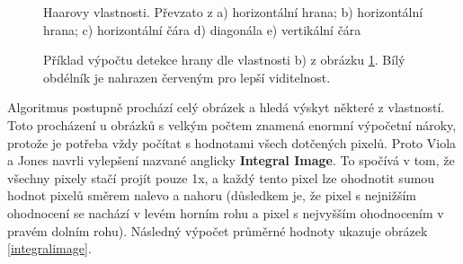 \begin{figure}[H]
  \begin{center}
  \label{haarfeatures}
  \caption{Haarovy vlastnosti. Převzato z \cite{violaJonesArticle}
  a) horizontální hrana; b) horizontální hrana; c) horizontální čára d) diagonála e) vertikální čára}
  \end{center}
\end{figure}

\begin{figure}[H]
  \begin{center}
  \label{haarexample}
  \caption{Příklad výpočtu detekce hrany dle vlastnosti b) z obrázku \ref{haarfeatures}. Bílý obdélník je nahrazen červeným pro lepší viditelnost.}
  \end{center}
\end{figure}

Algoritmus postupně prochází celý obrázek a hledá výskyt některé z vlastností. Toto procházení u obrázků s velkým počtem znamená enormní výpočetní nároky, protože je potřeba vždy počítat s hodnotami všech dotčených pixelů. Proto Viola a Jones \cite{violaJones} navrli
vylepšení nazvané anglicky \textbf{Integral Image}. To spočívá v tom, že všechny pixely stačí projít pouze 1x, a každý tento pixel lze ohodnotit sumou hodnot pixelů směrem nalevo a nahoru (důsledkem je, že pixel s nejnižším ohodnocení se nachází v levém horním rohu a pixel s nejvyšším ohodnocením v pravém dolním rohu). Následný výpočet průměrné hodnoty ukazuje obrázek \ref{integralimage}. 

